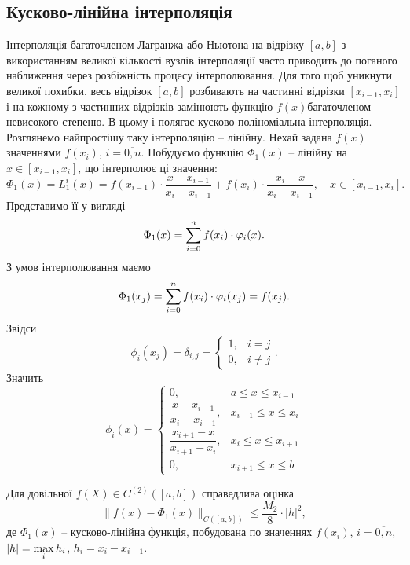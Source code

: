 \subsection{Кусково-лінійна інтерполяція}
Інтерполяція багаточленом Лагранжа або Ньютона на відрізку $[a,b]$ з використанням великої кількості вузлів інтерполяції часто приводить до поганого наближення через розбіжність процесу інтерполювання. Для того щоб уникнути великої похибки, весь відрізок $[a,b]$ розбивають на частинні відрізки $[x_{i-1}, x_i]$ і на кожному з частинних відрізків замінюють функцію $f(x)$багаточленом невисокого степеню. В цьому і полягає кусково-поліноміальна інтерполяція. \\

Розглянемо найпростішу таку інтерполяцію -- лінійну. Нехай задана $f(x)$ значеннями $f(x_i)$, $i=\overline{0,n}$. Побудуємо функцію $\Phi_1(x)$ -- лінійну на $x\in[x_{i-1},x_i]$, що інтерполює ці значення:
\begin{equation}
    \label{eq:6.21}
    \Phi_1(x) = L_1^i(x) = f(x_{i-1})\cdot \dfrac{x-x_{i-1}}{x_i-x_{i-1}} + f(x_i) \cdot \dfrac{x_i-x}{x_i-x_{i-1}}, \quad x \in [x_{i-1}, x_i].
\end{equation}
Представимо її у вигляді
\begin{equation}
    \label{eq:6.22}
    \Phi_1(x) = \displaystyle\sum\limits_{i=0}^n f(x_i) \cdot \varphi_i(x).
\end{equation}
З умов інтерполювання маємо \[ \Phi_1(x_j) = \displaystyle\sum\limits_{i=0}^n f(x_i) \cdot \varphi_i(x_j) = f(x_j). \] Звідси \[ \phi_i(x_j) = \delta_{i,j} = \begin{cases} 1, & i = j \\ 0, & i \ne j \end{cases}. \] Значить \[ \phi_i(x) = \begin{cases} 0, & a \le x \le x_{i-1} \\ \dfrac{x-x_{i-1}}{x_i-x_{i-1}}, & x_{i-1} \le x \le x_i \\ \dfrac{x_{i+1}-x}{x_{i+1}-x_i}, & x_i \le x \le x_{i+1} \\ 0, & x_{i+1} \le x \le b \end{cases} \]
\begin{theorem}
    Для довільної $f(X) \in C^{(2)}([a,b])$ справедлива оцінка
    \begin{equation}
        \label{eq:6.23}
        \|f(x)-\Phi_1(x)\|_{C([a,b])} \le \dfrac{M_2}{8}\cdot|h|^2,
    \end{equation}
    де $\Phi_1(x)$ -- кусково-лінійна функція, побудована по значеннях $f(x_i)$, $i=\overline{0,n}$, $|h|=\displaystyle\max\limits_i h_i$, $h_i = x_i - x_{i-1}$.
\end{theorem}
